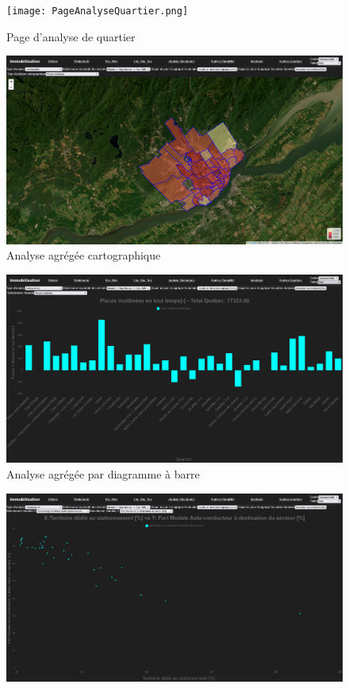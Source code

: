 \begin{landscape}
    \begin{figure}
        \centering
        \texttt{[image: PageAnalyseQuartier.png]}
        \caption{Page d'analyse de quartier}
        \label{fig:page-ana-quartier}
    \end{figure}
    \begin{figure}
        \centering
        \includegraphics[width=1\linewidth]{images/CartographieAnaQuartier.png}
        \caption{Analyse agrégée cartographique}
        \label{fig:ana-quartier-carto}
    \end{figure}
    \begin{figure}
        \centering
        \includegraphics[width=1\linewidth]{images/GraphBarAnaQuartier.png}
        \caption{Analyse agrégée par diagramme à barre}
        \label{fig:ana-quartier-diagramme-barre}
    \end{figure}
    \begin{figure}
        \centering
        \includegraphics[width=1\linewidth]{images/GraphiqueXYAnaQuartier.png}

\end{figure}
\end{landscape}

